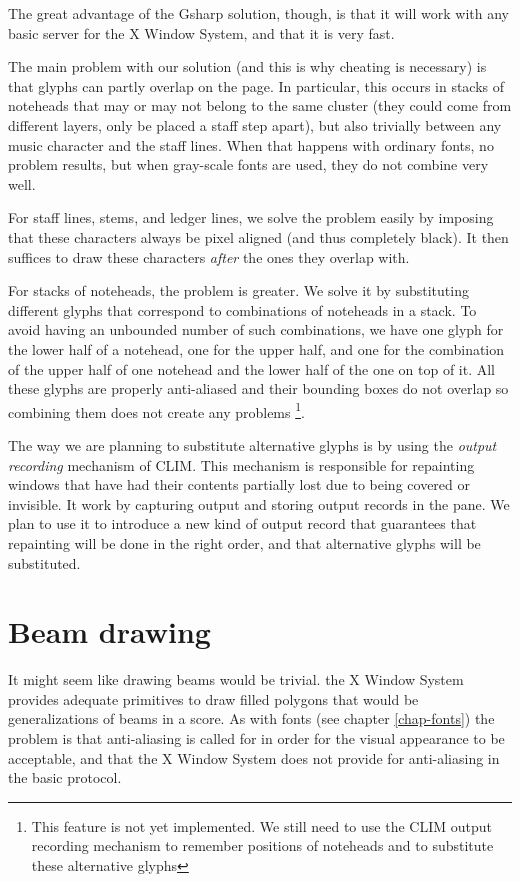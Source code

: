 \documentclass[11pt]{book}
\def\gs{Gsharp}
\def\clim{CLIM}
\def\xwin{the X Window System}
\def\unimp#1{\footnote{This feature is not yet implemented.  #1}}
\begin{document}
The great advantage of the {\gs} solution, though, is that it will
work with any basic server for {\xwin}, and that it is very fast. 

The main problem with our solution (and this is why cheating is
necessary) is that glyphs can partly overlap on the page.  In
particular, this occurs in stacks of noteheads that may or may not
belong to the same cluster (they could come from different layers,
only be placed a staff step apart), but also trivially between any
music character and the staff lines.  When that happens with ordinary
fonts, no problem results, but when gray-scale fonts are used, they do
not combine very well.  

For staff lines, stems, and ledger lines, we solve the problem easily
by imposing that these characters always be pixel aligned (and thus
completely black).  It then suffices to draw these characters
\emph{after} the ones they overlap with.  

For stacks of noteheads, the problem is greater.  We solve it by
substituting different glyphs that correspond to combinations of
noteheads in a stack.  To avoid having an unbounded number of such
combinations, we have one glyph for the lower half of a notehead, one
for the upper half, and one for the combination of the upper half of
one notehead and the lower half of the one on top of it.  All these
glyphs are properly anti-aliased and their bounding boxes do not
overlap so combining them does not create any problems \unimp{We still
need to use the {\clim} output recording mechanism to remember
positions of noteheads and to substitute these alternative glyphs}. 

The way we are planning to substitute alternative glyphs is by using
the \emph{output recording} mechanism of {\clim}.  This mechanism is
responsible for repainting windows that have had their contents
partially lost due to being covered or invisible.  It work by
capturing output and storing output records in the pane.  We plan to
use it to introduce a new kind of output record that guarantees that
repainting  will be done in the right order, and that alternative
glyphs will be substituted. 

\chapter{Beam drawing}

It might seem like drawing beams would be trivial.  {\xwin} provides
adequate primitives to draw filled polygons that would be
generalizations of beams in a score.  As with fonts (see chapter
\ref{chap-fonts}) the problem is that anti-aliasing is called for in
order for the visual appearance to be acceptable, and that {\xwin}
does not provide for anti-aliasing in the basic protocol.  
\end{document}
